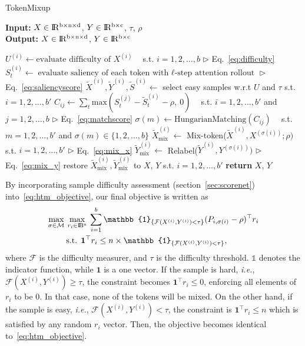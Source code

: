 \documentclass{article}
\begin{document}
\begin{algorithm}[t]
\caption{TokenMixup}
\label{alg:htm_v2}
\textbf{Input:} $X \in \rm I\!R^{b \times n \times d}$, $Y \in \rm I\!R^{b \times c}$, $\tau$, $\rho$\\
\textbf{Output:} $X \in \rm I\!R^{b \times n \times d}$, $Y \in \rm I\!R^{b \times c}$
\begin{algorithmic}[1]
    \State $U^{(i)} \gets \textrm{evaluate difficulty of } X^{(i)} \:\:\:\:$ s.t.  $i = 1, 2, \ldots, b$ \hfill $\triangleright$ Eq.~\eqref{eq:difficulty}
    \State $S_t^{(i)} \gets \textrm{evaluate saliency of each token with $\ell$-step attention rollout}$ \hfill $\triangleright$ Eq.~\eqref{eq:saliencyscore}
    \State $\tilde{X}^{(i)}, \tilde{Y}^{(i)}, \tilde{S}^{(i)} \gets $ select easy samples w.r.t $U$ and $\tau$  \:\:\:\: s.t.  $i = 1, 2, \ldots, b'$
    \State $C_{ij} \gets \sum_{t} \textrm{max}(S_t ^{(j)} - \tilde{S}_t^{(i)} - \rho,\:  0) \:\:\:\:$ s.t. $i = 1, 2, \ldots, b'$ and $j = 1, 2, \ldots, b$ \hfill $\triangleright$ Eq.~\eqref{eq:matchscore}
    \State $\sigma(m) \gets \textrm{HungarianMatching}(C_{ij})\:\:\:\:$ s.t. $m = 1, 2, \ldots, b'$ and $\sigma(m) \in \{1, 2, \ldots, b\}$
    \State $\tilde{X}^{(i)}_{\textrm{mix}} \gets$ Mix-token($\tilde{X}^{(i)}, X^{(\sigma(i))}; \rho)$ \:\:\:\: s.t. $i = 1, 2, \ldots, b'$ \hfill $\triangleright$ Eq.~\eqref{eq:mix_x}
    \State $\tilde{Y}^{(i)}_{\textrm{mix}} \gets$ Relabel($\tilde{Y}^{(i)}, Y^{(\sigma(i))})$ \hfill $\triangleright$ Eq.~\eqref{eq:mix_y}
    \State restore $\tilde{X}^{(i)}_{\textrm{mix}}, \tilde{Y}^{(i)}_{\textrm{mix}}$ to $X$, $Y$ \:\:\:\: s.t. $i = 1, 2, \ldots, b'$
    \State \textbf{return } $X$, $Y$
\end{algorithmic}
\end{algorithm}  



 By incorporating sample difficulty assessment (section~\ref{sec:scorenet}) into~\eqref{eq:htm_objective}, our final objective is written as
\begin{equation}
\label{eq:htm_objective2}
\begin{aligned}
    \max_{\sigma \in \mathcal{M}} \: & \max_{r_i \in {\rm I\!B^n}} \: \displaystyle \sum _{i=1}^b \mathbb{1}_{\{\mathcal{F}(X^{(i)}, Y^{(i)}) < \tau \}}(P_{i, \sigma(i)}-\rho)^\top  r_i \\ & \textrm{s.t.} \:\: \mathbf{1}^\top r_i \leq n \times \mathbb{1}_{\{\mathcal{F}(X^{(i)}, Y^{(i)}) < \tau\}},
\end{aligned}
\end{equation}
where $\mathcal{F}$ is the difficulty measurer, and $\tau$ is the difficulty threshold.
$\mathbb{1}$ denotes the indicator function, while $\mathbf{1}$ is a one vector.
If the sample is hard, \textit{i.e.}, $\mathcal{F}(X^{(i)}, Y^{(i)}) \geq \tau$, the constraint becomes $\mathbf{1}^\top r_i \leq 0$, enforcing all elements of $r_i$ to be 0. 
In that case, none of the tokens will be mixed.
On the other hand, if the sample is easy, \textit{i.e.}, $\mathcal{F}(X^{(i)}, Y^{(i)}) < \tau$, the constraint is $\mathbf{1}^\top r_i \leq n$ which is satisfied by any random $r_i$ vector.
Then, the objective becomes identical to~\eqref{eq:htm_objective}.
 
\end{document}
